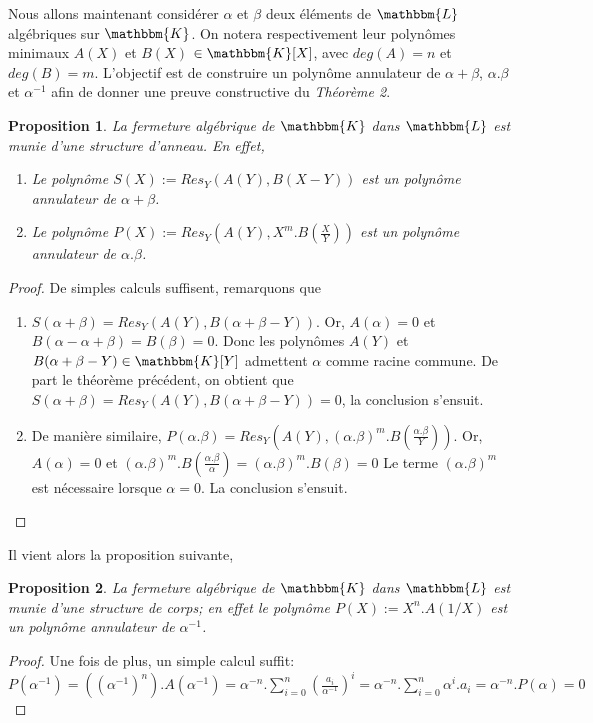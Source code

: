 \documentclass[12pt]{article}
\newcommand{\jL}{\mathbbm{L}}
\newcommand{\K}{\mathbbm{K}}
\newtheorem{prop}{Proposition}
\theoremstyle{definition}\newtheorem{defn}{Définition}
\theoremstyle{definition}\newtheorem{exm}{Exemple}
\theoremstyle{definition}\newtheorem{rem}{Remarque}
\theoremstyle{definition}\newtheorem{algo}{Algorithme}
\theoremstyle{remark}\newtheorem{exo}{Exercice}
\theoremstyle{remark}\newtheorem{nota}{Notation}
\begin{document}
Nous allons maintenant considérer $\alpha$ et $\beta$ deux éléments de $\jL$ algébriques sur $\K$. On notera respectivement leur polynômes minimaux $A(X)$ et $B(X)$ $\in \K[X]$, avec $deg(A) = n$ et $deg(B) = m$. L'objectif est de construire un polynôme annulateur de $\alpha + \beta$, $\alpha.\beta$ et $\alpha^{-1}$ afin de donner une preuve constructive du \textit{Théorème 2}.

\begin{prop}
La fermeture algébrique de $\K$ dans $\jL$ est munie d'une structure d'anneau. En effet,
	\begin{enumerate}[label=\roman*)]
		\item Le polynôme $S(X) := Res_Y(A(Y),B(X-Y))$ est \textit{un} polynôme annulateur de $\alpha + \beta$.
		\item Le polynôme $P(X) := Res_Y(A(Y), X^m.B(\frac{X}{Y}))$ est \textit{un} polynôme annulateur de $\alpha.\beta$.
	\end{enumerate}
\end{prop}

\begin{proof} De simples calculs suffisent, remarquons que
	\begin{enumerate}[label=\roman*)]
		\item $S(\alpha + \beta) = Res_Y(A(Y),B(\alpha + \beta - Y))$. Or, $A(\alpha) = 0$ et $B (\alpha-\alpha + \beta) = B(\beta) = 0$. Donc les polynômes $A(Y)$ et $B (\alpha + \beta - Y) \in \K[Y]$ admettent $\alpha$ comme racine commune. De part le théorème précédent, on obtient que $S(\alpha + \beta) = Res_Y(A(Y),B(\alpha + \beta-Y)) = 0$, la conclusion s'ensuit. 
		\item De manière similaire, $P(\alpha.\beta) = Res_Y(A(Y), (\alpha.\beta)^m.B(\frac{\alpha.\beta}{Y}))$. Or, $A(\alpha) = 0$ et $(\alpha.\beta)^m.B(\frac{\alpha.\beta}{\alpha}) = (\alpha.\beta)^m.B(\beta) = 0$ Le terme $(\alpha.\beta)^m$ est nécessaire lorsque $\alpha = 0$. La conclusion s'ensuit.
	\end{enumerate}
\end{proof}
Il vient alors la proposition suivante,
\begin{prop}
La fermeture algébrique de $\K$ dans $\jL$ est munie d'une structure de corps; en effet le polynôme $P(X) := X^n.A(1/X)$ est un polynôme annulateur de $\alpha^{-1}$.
\end{prop}

\begin{proof}
Une fois de plus, un simple calcul suffit: \newline
$P(\alpha^{-1}) = ((\alpha^{-1})^n).A(\alpha^{-1}) = \alpha^{-n}.\displaystyle\sum_{i=0}^n (\frac{a_i}{\alpha^{-1}})^i = \alpha^{-n}.\sum_{i=0}^n \alpha^i.a_i = \alpha^{-n}.P(\alpha) = 0$
\end{proof}
\end{document}
